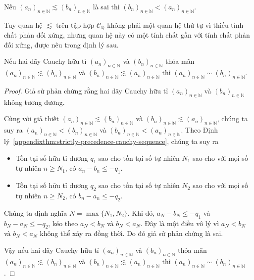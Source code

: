 \begin{corollary}
    Nếu ${(a_{n})}_{n\in\mathbb{N}}\lesssim {(b_{n})}_{n\in\mathbb{N}}$ là sai thì ${(b_{n})}_{n\in\mathbb{N}} < {(a_{n})}_{n\in\mathbb{N}}$.
\end{corollary}

Tuy quan hệ $\lesssim$ trên tập hợp $\mathscr{C}_{\mathbb{Q}}$ không phải một quan hệ thứ tự vì thiếu tính chất phản đối xứng, nhưng quan hệ này có một tính chất gần với tính chất phản đối xứng, được nêu trong định lý sau.

\begin{appendixthm}\label{appendixthm:cauchy-sequences-pre-antisymmetric}
    Nếu hai dãy Cauchy hữu tỉ ${(a_{n})}_{n\in\mathbb{N}}$ và ${(b_{n})}_{n\in\mathbb{N}}$ thỏa mãn ${(a_{n})}_{n\in\mathbb{N}}\lesssim {(b_{n})}_{n\in\mathbb{N}}$ và ${(b_{n})}_{n\in\mathbb{N}}\lesssim {(a_{n})}_{n\in\mathbb{N}}$ thì ${(a_{n})}_{n\in\mathbb{N}}\sim {(b_{n})}_{n\in\mathbb{N}}$.
\end{appendixthm}

\begin{proof}
    Giả sử phản chứng rằng hai dãy Cauchy hữu tỉ ${(a_{n})}_{n\in\mathbb{N}}$ và ${(b_{n})}_{n\in\mathbb{N}}$ không tương đương.

    Cùng với giả thiết ${(a_{n})}_{n\in\mathbb{N}}\lesssim {(b_{n})}_{n\in\mathbb{N}}$ và ${(b_{n})}_{n\in\mathbb{N}}\lesssim {(a_{n})}_{n\in\mathbb{N}}$, chúng ta suy ra  ${(a_{n})}_{n\in\mathbb{N}} < {(b_{n})}_{n\in\mathbb{N}}$ và ${(b_{n})}_{n\in\mathbb{N}} < {(a_{n})}_{n\in\mathbb{N}}$. Theo Định lý~\ref{appendixthm:strictly-precedence-cauchy-sequence}, chúng ta suy ra
    \begin{itemize}
        \item Tồn tại số hữu tỉ dương $q_{1}$ sao cho tồn tại số tự nhiên $N_{1}$ sao cho với mọi số tự nhiên $n\geq N_{1}$, có $a_{n} - b_{n}\leq -q_{1}$.
        \item Tồn tại số hữu tỉ dương $q_{2}$ sao cho tồn tại số tự nhiên $N_{2}$ sao cho với mọi số tự nhiên $n\geq N_{2}$, có $b_{n} - a_{n}\leq -q_{2}$.
    \end{itemize}

    Chúng ta định nghĩa $N = \max\{ N_{1}, N_{2} \}$. Khi đó, $a_{N} - b_{N}\leq -q_{1}$ và $b_{N} - a_{N}\leq -q_{2}$, kéo theo $a_{N} < b_{N}$ và $b_{N} < a_{N}$. Đây là một điều vô lý vì $a_{N} < b_{N}$ và $b_{N} < a_{N}$ không thể xảy ra đồng thời. Do đó giả sử phản chứng là sai.

    Vậy nếu hai dãy Cauchy hữu tỉ ${(a_{n})}_{n\in\mathbb{N}}$ và ${(b_{n})}_{n\in\mathbb{N}}$ thỏa mãn ${(a_{n})}_{n\in\mathbb{N}}\lesssim {(b_{n})}_{n\in\mathbb{N}}$ và ${(b_{n})}_{n\in\mathbb{N}}\lesssim {(a_{n})}_{n\in\mathbb{N}}$ thì ${(a_{n})}_{n\in\mathbb{N}}\sim {(b_{n})}_{n\in\mathbb{N}}$.
\end{proof}

